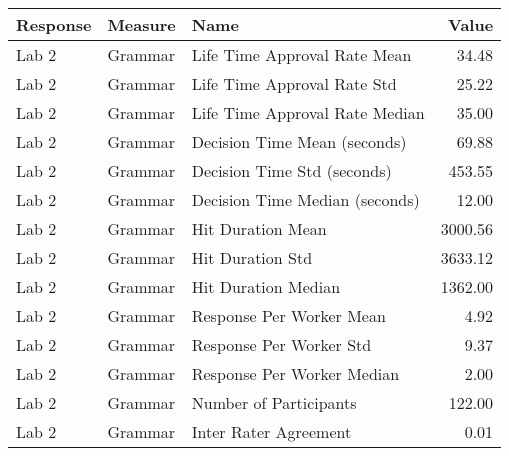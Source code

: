 \begin{tabular}{lllr}
\toprule
Response & Measure & Name & Value \\
\midrule
Lab 2 & Grammar & Life Time Approval Rate Mean & 34.48 \\
Lab 2 & Grammar & Life Time Approval Rate Std & 25.22 \\
Lab 2 & Grammar & Life Time Approval Rate Median & 35.00 \\
Lab 2 & Grammar & Decision Time Mean (seconds) & 69.88 \\
Lab 2 & Grammar & Decision Time Std (seconds) & 453.55 \\
Lab 2 & Grammar & Decision Time Median (seconds) & 12.00 \\
Lab 2 & Grammar & Hit Duration Mean & 3000.56 \\
Lab 2 & Grammar & Hit Duration Std & 3633.12 \\
Lab 2 & Grammar & Hit Duration Median & 1362.00 \\
Lab 2 & Grammar & Response Per Worker Mean & 4.92 \\
Lab 2 & Grammar & Response Per Worker Std & 9.37 \\
Lab 2 & Grammar & Response Per Worker Median & 2.00 \\
Lab 2 & Grammar & Number of Participants & 122.00 \\
Lab 2 & Grammar & Inter Rater Agreement & 0.01 \\
\bottomrule
\end{tabular}
